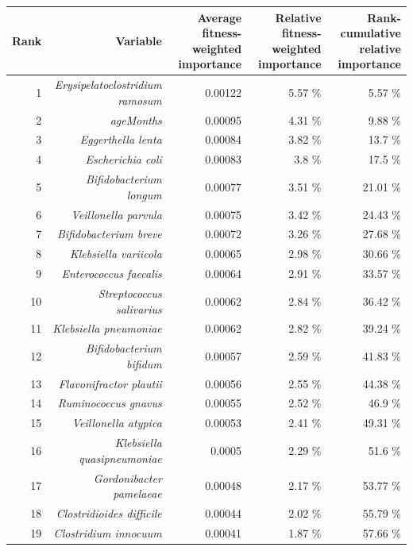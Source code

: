 \documentclass{article}
\begin{document}
\begin{table}[h]
    \begin{centering}
    \tiny
    \begin{tabular}{|r|r|r|r|r|}
      \hline\hline
      \textbf{Rank} & \textbf{Variable} & \textbf{Average fitness-weighted importance} & \textbf{Relative fitness-weighted importance} & \textbf{Rank-cumulative relative importance } \\\hline
      1 & \textit{Erysipelatoclostridium ramosum} & 0.00122 & 5.57 \% & 5.57 \% \\
      2 & \textit{ageMonths} & 0.00095 & 4.31 \% & 9.88 \% \\
      3 & \textit{Eggerthella lenta} & 0.00084 & 3.82 \% & 13.7 \% \\
      4 & \textit{Escherichia coli} & 0.00083 & 3.8 \% & 17.5 \% \\
      5 & \textit{Bifidobacterium longum} & 0.00077 & 3.51 \% & 21.01 \% \\
      6 & \textit{Veillonella parvula} & 0.00075 & 3.42 \% & 24.43 \% \\
      7 & \textit{Bifidobacterium breve} & 0.00072 & 3.26 \% & 27.68 \% \\
      8 & \textit{Klebsiella variicola} & 0.00065 & 2.98 \% & 30.66 \% \\
      9 & \textit{Enterococcus faecalis} & 0.00064 & 2.91 \% & 33.57 \% \\
      10 & \textit{Streptococcus salivarius} & 0.00062 & 2.84 \% & 36.42 \% \\
      11 & \textit{Klebsiella pneumoniae} & 0.00062 & 2.82 \% & 39.24 \% \\
      12 & \textit{Bifidobacterium bifidum} & 0.00057 & 2.59 \% & 41.83 \% \\
      13 & \textit{Flavonifractor plautii} & 0.00056 & 2.55 \% & 44.38 \% \\
      14 & \textit{Ruminococcus gnavus} & 0.00055 & 2.52 \% & 46.9 \% \\
      15 & \textit{Veillonella atypica} & 0.00053 & 2.41 \% & 49.31 \% \\
      16 & \textit{Klebsiella quasipneumoniae} & 0.0005 & 2.29 \% & 51.6 \% \\
      17 & \textit{Gordonibacter pamelaeae} & 0.00048 & 2.17 \% & 53.77 \% \\
      18 & \textit{Clostridioides difficile} & 0.00044 & 2.02 \% & 55.79 \% \\
      19 & \textit{Clostridium innocuum} & 0.00041 & 1.87 \% & 57.66 \% \\

\end{tabular}
\end{centering}
\end{table}
\end{document}
